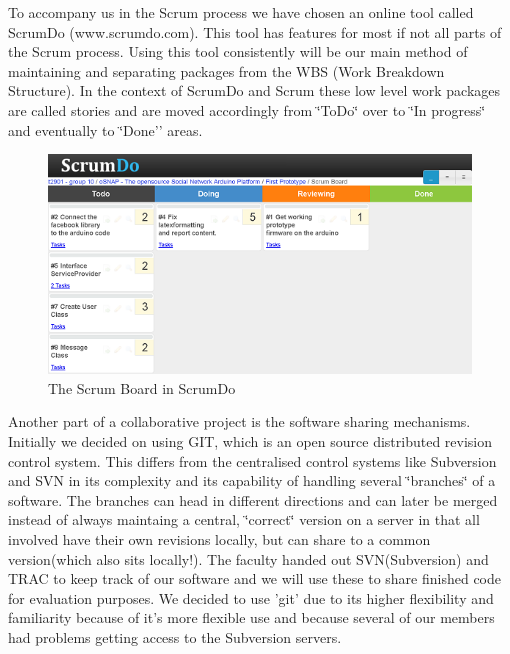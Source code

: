 To accompany us in the Scrum process we have chosen an online tool
called ScrumDo (www.scrumdo.com). This tool has features for most
if not all parts of the Scrum process. Using this tool consistently
	will be our main method of maintaining and separating packages from
	the WBS (Work Breakdown Structure). In the context of ScrumDo and
	Scrum these low level work packages are called stories and are moved
	accordingly from \char`\"{}ToDo\char`\"{} over to \char`\"{}In progress\char`\"{}
	and eventually to \char`\"{}Done'' areas.
	
	\begin{figure}
	\centering \includegraphics{img/management-scrumdo} \caption{The Scrum Board in ScrumDo}
	
	
	\label{fig:management-scrumdo}
	\end{figure}
	
	
	Another part of a collaborative project is the software sharing mechanisms.
	Initially we decided on using GIT, which is an open source distributed
	revision control system. This differs from the centralised control
	systems like Subversion and SVN in its complexity and its capability
	of handling several \char`\"{}branches\char`\"{} of a software. The
	branches can head in different directions and can later be merged
	instead of always maintaing a central, \char`\"{}correct\char`\"{}
	version on a server in that all involved have their own revisions
	locally, but can share to a common version(which also sits locally!).
	The faculty handed out SVN(Subversion) and TRAC to keep track of our
	software and we will use these to share finished code for evaluation
	purposes. We decided to use 'git' due to its higher flexibility and
	familiarity because of it's more flexible use and because several
	of our members had problems getting access to the Subversion servers.
	